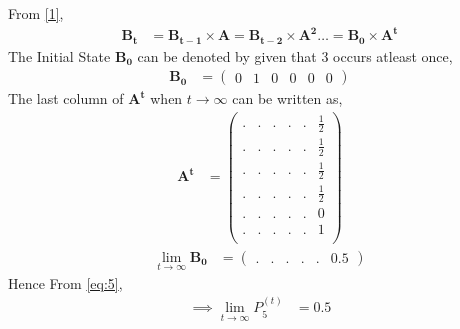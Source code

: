 \documentclass[journal,12pt,onecolumn]{IEEEtran}
\begin{document}
From \eqref{1},
\begin{align}
    \mathbf{B_{t}} &= \mathbf{B_{t-1}} \times \mathbf{A} = \mathbf{B_{t-2}} \times \mathbf{A^2} \dots
    =\mathbf{B_{0}} \times \mathbf{A^t}
\end{align}
The Initial State $\mathbf{B_{0}}$ can be denoted by given that 3 occurs atleast once,
\begin{align}
\mathbf{B_{0}} &= 
\begin{pmatrix}
0 & 1 & 0 & 0 & 0 & 0
\end{pmatrix}
\end{align}
The last column of $ \mathbf{A^t}$ when $t \to \infty$ can be written as,
\begin{align}
\mathbf{A^t} &= 
\begin{pmatrix}
 . & . & . & . & . & \frac{1}{2} \\[4pt]
 . & . & . & . & . & \frac{1}{2} \\[4pt]
 . & . & . & . & . & \frac{1}{2} \\[4pt]
 . & . & . & . & . & \frac{1}{2} \\[4pt]
 . & . & . & . & . & 0 \\[4pt]
 . & . & . & . & . & 1 \\
\end{pmatrix}
\end{align}
\begin{align}
\lim_{t \to \infty} \mathbf{B_{0}} &= 
\begin{pmatrix}
. & . & . & . & . & 0.5
\end{pmatrix}
\end{align} 
Hence From \eqref{eq:5},
\begin{align} 
\implies \lim_{t \to \infty} P_{5}^{(t)} &= 0.5
\end{align} 
\end{document}
